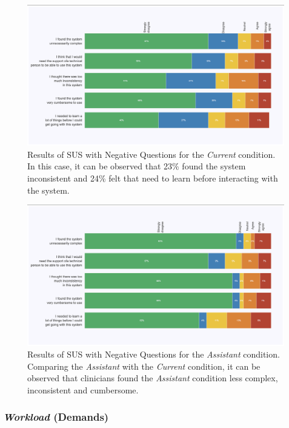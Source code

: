 \begin{figure}[htbp]
\centering
\includegraphics[width=\textwidth]{images/fig035}
\caption{Results of SUS with Negative Questions for the {\it Current} condition. In this case, it can be observed that 23\% found the system inconsistent and 24\% felt that need to learn before interacting with the system.}
\label{fig:fig035}
\end{figure}

\begin{figure}[htbp]
\centering
\includegraphics[width=\textwidth]{images/fig036}
\caption{Results of SUS with Negative Questions for the {\it Assistant} condition. Comparing the {\it Assistant} with the {\it Current} condition, it can be observed that clinicians found the {\it Assistant} condition less complex, inconsistent and cumbersome.}
\label{fig:fig036}
\end{figure}

\subsubsection{{\it Workload} (Demands)}
\label{sec:chap005006001003}

